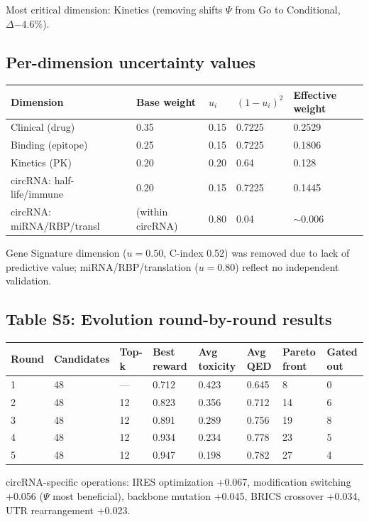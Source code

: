Most critical dimension: Kinetics (removing shifts $\Psi$ from Go to Conditional, $\Delta{-4.6\%}$).

\subsection*{Per-dimension uncertainty values}

\begin{tabular}{lllll}
\toprule
\textbf{Dimension} & \textbf{Base weight} & \textbf{$u_i$} & \textbf{$(1-u_i)^2$} & \textbf{Effective weight} \\
\midrule
Clinical (drug) & 0.35 & 0.15 & 0.7225 & 0.2529 \\
Binding (epitope) & 0.25 & 0.15 & 0.7225 & 0.1806 \\
Kinetics (PK) & 0.20 & 0.20 & 0.64 & 0.128 \\
circRNA: half-life/immune & 0.20 & 0.15 & 0.7225 & 0.1445 \\
circRNA: miRNA/RBP/transl & (within circRNA) & 0.80 & 0.04 & $\sim$0.006 \\
\bottomrule
\end{tabular}

Gene Signature dimension ($u{=}0.50$, C-index 0.52) was removed due to lack of predictive value; miRNA/RBP/translation ($u{=}0.80$) reflect no independent validation.

\subsection*{Table S5: Evolution round-by-round results}

\begin{tabular}{llllllll}
\toprule
\textbf{Round} & \textbf{Candidates} & \textbf{Top-k} & \textbf{Best reward} & \textbf{Avg toxicity} & \textbf{Avg QED} & \textbf{Pareto front} & \textbf{Gated out} \\
\midrule
1 & 48 & --- & 0.712 & 0.423 & 0.645 & 8 & 0 \\
2 & 48 & 12 & 0.823 & 0.356 & 0.712 & 14 & 6 \\
3 & 48 & 12 & 0.891 & 0.289 & 0.756 & 19 & 8 \\
4 & 48 & 12 & 0.934 & 0.234 & 0.778 & 23 & 5 \\
5 & 48 & 12 & 0.947 & 0.198 & 0.782 & 27 & 4 \\
\bottomrule
\end{tabular}

circRNA-specific operations: IRES optimization +0.067, modification switching +0.056 ($\Psi$ most beneficial), backbone mutation +0.045, BRICS crossover +0.034, UTR rearrangement +0.023.

